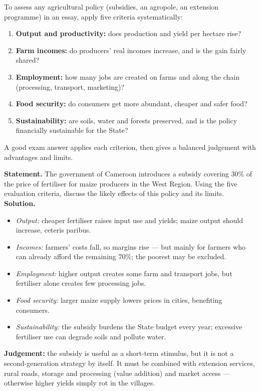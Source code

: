 \documentclass[11pt]{article}
\begin{document}
\begin{methode}
To assess any agricultural policy (subsidies, an agropole, an extension programme) in an essay, apply five criteria systematically:
\begin{enumerate}
\item \textbf{Output and productivity:} does production and yield per hectare rise?
\item \textbf{Farm incomes:} do producers' real incomes increase, and is the gain fairly shared?
\item \textbf{Employment:} how many jobs are created on farms and along the chain (processing, transport, marketing)?
\item \textbf{Food security:} do consumers get more abundant, cheaper and safer food?
\item \textbf{Sustainability:} are soils, water and forests preserved, and is the policy financially sustainable for the State?
\end{enumerate}
A good exam answer applies each criterion, then gives a balanced judgement with advantages and limits.
\end{methode}

\begin{exoresolu}
\textbf{Statement.} The government of Cameroon introduces a subsidy covering 30\% of the price of fertiliser for maize producers in the West Region. Using the five evaluation criteria, discuss the likely effects of this policy and its limits. \tcblower
\textbf{Solution.}
\begin{itemize}
\item \emph{Output:} cheaper fertiliser raises input use and yields; maize output should increase, ceteris paribus.
\item \emph{Incomes:} farmers' costs fall, so margins rise — but mainly for farmers who can already afford the remaining 70\%; the poorest may be excluded.
\item \emph{Employment:} higher output creates some farm and transport jobs, but fertiliser alone creates few processing jobs.
\item \emph{Food security:} larger maize supply lowers prices in cities, benefiting consumers.
\item \emph{Sustainability:} the subsidy burdens the State budget every year; excessive fertiliser use can degrade soils and pollute water.
\end{itemize}
\textbf{Judgement:} the subsidy is useful as a short-term stimulus, but it is not a second-generation strategy by itself. It must be combined with extension services, rural roads, storage and processing (value addition) and market access — otherwise higher yields simply rot in the villages.
\end{exoresolu}
\end{document}

